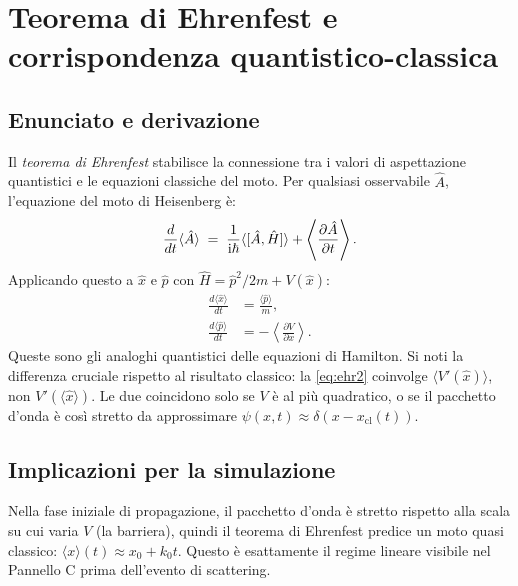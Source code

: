 \documentclass[12pt, a4paper]{article}
\newcommand{\ii}{\mathrm{i}}          %
\begin{document}
\section{Teorema di Ehrenfest e corrispondenza quantistico-classica}
\label{app:ehrenfest}

\subsection{Enunciato e derivazione}

Il \emph{teorema di Ehrenfest} stabilisce la connessione tra i valori
di aspettazione quantistici e le equazioni classiche del moto.  Per
qualsiasi osservabile $\hat{A}$, l'equazione del moto di Heisenberg è:
\begin{equation}
  \frac{d}{dt}\langle\hat{A}\rangle \;=\;
  \frac{1}{\ii\hbar}\langle[\hat{A},\hat{H}]\rangle
  + \left\langle\pdv{\hat{A}}{t}\right\rangle.
\end{equation}
Applicando questo a $\hat{x}$ e $\hat{p}$ con
$\hat{H} = \hat{p}^2/2m + V(\hat{x})$:
\begin{align}
  \frac{d\langle\hat{x}\rangle}{dt}
  &= \frac{\langle\hat{p}\rangle}{m}, \label{eq:ehr1} \\
  \frac{d\langle\hat{p}\rangle}{dt}
  &= -\left\langle\frac{\partial V}{\partial x}\right\rangle. \label{eq:ehr2}
\end{align}
Queste sono gli analoghi quantistici delle equazioni di Hamilton.
Si noti la differenza cruciale rispetto al risultato classico:
la \eqref{eq:ehr2} coinvolge $\langle V'(\hat{x})\rangle$, non
$V'(\langle\hat{x}\rangle)$.  Le due coincidono solo se $V$ è al
più quadratico, o se il pacchetto d'onda è così stretto da approssimare
$\psi(x,t) \approx \delta(x - x_\text{cl}(t))$.

\subsection{Implicazioni per la simulazione}

Nella fase iniziale di propagazione, il pacchetto d'onda è stretto
rispetto alla scala su cui varia $V$ (la barriera), quindi il teorema
di Ehrenfest predice un moto quasi classico:
$\langle x\rangle(t) \approx x_0 + k_0 t$.  Questo è esattamente
il regime lineare visibile nel Pannello C prima dell'evento di
scattering.
\end{document}
